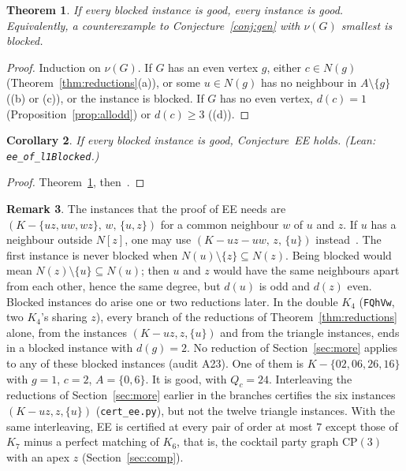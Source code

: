\documentclass[11pt]{amsart}
\newtheorem{theorem}{Theorem}[section]
\newtheorem{corollary}[theorem]{Corollary}
\theoremstyle{definition}
\newtheorem{remark}[theorem]{Remark}
\begin{document}
\begin{theorem}\label{thm:blocked}
If every blocked instance is good, every instance is good. Equivalently, a counterexample to
Conjecture~\ref{conj:gen} with $\nu(G)$ smallest is blocked.
\end{theorem}

\begin{proof}
Induction on $\nu(G)$. If $G$ has an even vertex $g$, either $c\in N(g)$ (Theorem~\ref{thm:reductions}(a)),
or some $u\in N(g)$ has no neighbour in $A\setminus\{g\}$ ((b) or (c)), or the instance is blocked.
If $G$ has no even vertex, $d(c)=1$ (Proposition~\ref{prop:allodd}) or $d(c)\ge3$ ((d)).
\end{proof}

\begin{corollary}\label{cor:eeblocked}
If every blocked instance is good, Conjecture~EE holds.
\emph{(Lean: \texttt{ee\_of\_\allowbreak l1Blocked}.)}
\end{corollary}

\begin{proof}
Theorem~\ref{thm:blocked}, then~\cite[Corollary~7.4]{PE}.
\end{proof}

\begin{remark}
The instances that the proof of EE needs are $(K-\{uz,uw,wz\},\,w,\,\{u,z\})$ for a common
neighbour $w$ of $u$ and $z$. If $u$ has a neighbour outside $N[z]$, one may use
$(K-uz-uw,\,z,\,\{u\})$ instead~\cite{PE}. The first instance is never blocked when $N(u)\setminus\{z\}\subseteq N(z)$.
Being blocked would mean $N(z)\setminus\{u\}\subseteq N(u)$; then $u$ and $z$ would have the same
neighbours apart from each other, hence the same degree, but $d(u)$ is odd and $d(z)$ even. Blocked
instances do arise one or two reductions later. In the double $K_4$ (\texttt{FQhVw}, two $K_4$'s
sharing $z$), every branch of the reductions of Theorem~\ref{thm:reductions} alone, from the
instances $(K-uz,z,\{u\})$ and from the triangle instances, ends in a blocked instance with
$d(g)=2$. No reduction of Section~\ref{sec:more} applies to any of these blocked instances (audit
A23). One of them is $K-\{02,06,26,16\}$ with $g=1$, $c=2$, $A=\{0,6\}$. It is good, with $Q_c=24$.
Interleaving the reductions of Section~\ref{sec:more} earlier in the branches certifies the six
instances $(K-uz,z,\{u\})$ (\texttt{cert\_ee.py}), but not the twelve triangle instances. With the
same interleaving, EE is certified at every pair of order at most $7$ except those of $K_7$ minus a
perfect matching of $K_6$, that is, the cocktail party graph $\mathrm{CP}(3)$ with an apex $z$
(Section~\ref{sec:comp}).
\end{remark}
\end{document}
